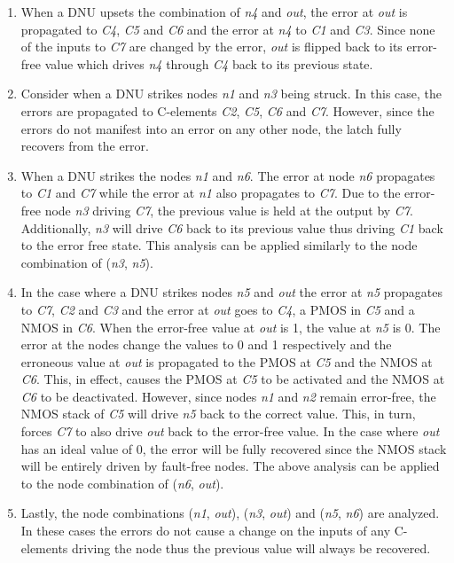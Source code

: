 \begin{enumerate}
	\item When a DNU upsets the combination of \textit{n4} and \textit{out}, the error at \textit{out} is propagated to \textit{C4}, \textit{C5} and \textit{C6} and the error at \textit{n4} to \textit{C1} and \textit{C3}. Since none of the inputs to \textit{C7} are changed by the error, \textit{out} is flipped back to its error-free value which drives \textit{n4} through \textit{C4} back to its previous state.
	
	\item Consider when a DNU strikes nodes \textit{n1} and \textit{n3} being struck. In this case, the errors are propagated to C-elements \textit{C2}, \textit{C5}, \textit{C6} and \textit{C7}. However, since the errors do not manifest into an error on any other node, the latch fully recovers from the error. 
	
	\item When a DNU strikes the nodes \textit{n1} and \textit{n6}. The error at node \textit{n6} propagates to  \textit{C1} and \textit{C7} while the error at \textit{n1} also propagates to \textit{C7}. Due to the error-free node \textit{n3} driving \textit{C7}, the previous value is held at the output by \textit{C7}. Additionally, \textit{n3} will drive \textit{C6} back to its previous value thus driving \textit{C1} back to the error free state. This analysis can be applied similarly to the node combination of (\textit{n3}, \textit{n5}). 
	
	\item In the case where a DNU strikes nodes \textit{n5} and \textit{out} the error at \textit{n5} propagates to \textit{C7}, \textit{C2} and \textit{C3} and the error at \textit{out} goes to \textit{C4}, a PMOS in \textit{C5} and a NMOS in \textit{C6}. When the error-free value at \textit{out} is 1, the value at \textit{n5} is 0. The error at the nodes change the values to 0 and 1 respectively and the erroneous value at \textit{out} is propagated to the PMOS at \textit{C5} and the NMOS at \textit{C6}. This, in effect, causes the PMOS at \textit{C5} to be activated and the NMOS at \textit{C6} to be deactivated. However, since nodes \textit{n1} and \textit{n2} remain error-free, the NMOS stack of \textit{C5} will drive \textit{n5} back to the correct value. This, in turn, forces \textit{C7} to also drive \textit{out} back to the error-free value. In the case where \textit{out} has an ideal value of 0, the error will be fully recovered since the NMOS stack will be entirely driven by fault-free nodes. The above analysis can be applied to the node combination of (\textit{n6}, \textit{out}). 
	
	\item Lastly, the node combinations (\textit{n1}, \textit{out}), (\textit{n3}, \textit{out}) and (\textit{n5}, \textit{n6}) are analyzed. In these cases the errors do not cause a change on the inputs of any C-elements driving the node thus the previous value will always be recovered. 
\end{enumerate}

